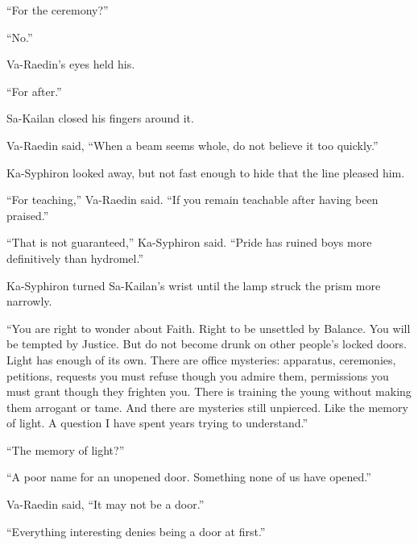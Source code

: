 “For the ceremony?”\par

“No.”\par

Va-Raedin’s eyes held his.\par

“For after.”\par

Sa-Kailan closed his fingers around it.\par

Va-Raedin said, “When a beam seems whole, do not believe it too quickly.”\par

Ka-Syphiron looked away, but not fast enough to hide that the line pleased him.\par

“For teaching,” Va-Raedin said.
“If you remain teachable after having been praised.”\par

“That is not guaranteed,” Ka-Syphiron said.
“Pride has ruined boys more definitively than hydromel.”\par




Ka-Syphiron turned Sa-Kailan’s wrist until the lamp struck the prism more narrowly.\par

“You are right to wonder about Faith.
Right to be unsettled by Balance.
You will be tempted by Justice.
But do not become drunk on other people’s locked doors.
Light has enough of its own.
There are office mysteries: apparatus, ceremonies, petitions, requests you must refuse though you admire them, permissions you must grant though they frighten you.
There is training the young without making them arrogant or tame.
And there are mysteries still unpierced.
Like the memory of light.
A question I have spent years trying to understand.”\par

“The memory of light?”\par

“A poor name for an unopened door.
Something none of us have opened.”\par

Va-Raedin said, “It may not be a door.”\par

“Everything interesting denies being a door at first.”\par

